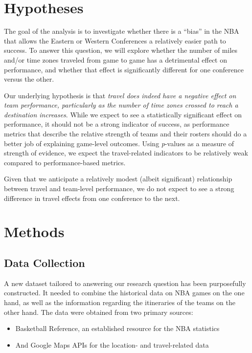 \documentclass[
    12pt,
    a4paper,
    titlepage,  %
    abstract,  %
    headings=standardclasses,  %
    bibliography=totocnumbered  %
]{scrartcl}
\begin{document}
\section{Hypotheses}
The goal of the analysis is to investigate whether there is a ``bias'' in the NBA that allows the Eastern or Western Conferences a relatively easier path to success. To answer this question, we will explore whether the number of miles and/or time zones traveled from game to game has a detrimental effect on performance, and whether that effect is significantly different for one conference versus the other.

Our underlying hypothesis is that \emph{travel does indeed have a negative effect on team performance, particularly as the number of time zones crossed to reach a destination increases}. While we expect to see a statistically significant effect on performance, it should not be a strong indicator of success, as performance metrics that describe the relative strength of teams and their rosters should do a better job of explaining game-level outcomes. Using \emph{p}-values as a measure of strength of evidence, we expect the travel-related indicators to be relatively weak compared to performance-based metrics.

Given that we anticipate a relatively modest (albeit significant) relationship between travel and team-level performance, we do not expect to see a strong difference in travel effects from one conference to the next.

\section{Methods}
\subsection{Data Collection}

A new dataset tailored to answering our research question has been purposefully constructed. It needed to combine the historical data on NBA games on the one hand, as well as the information regarding the itineraries of the teams on the other hand. The data were obtained from two primary sources:

\begin{itemize}
    \item Basketball Reference, an established resource for the NBA statistics
    \item And Google Maps APIs for the location- and travel-related data
\end{itemize}
\end{document}
